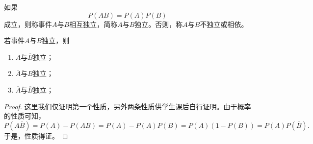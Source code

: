 \begin{definition}[独立性]
    如果
    $$P(AB) = P(A)P(B)$$
    成立，则称事件$A$与$B$相互独立，简称$A$与$B$独立。否则，称$A$与$B$不独立或相依。
\end{definition}

\begin{property}
若事件$A$与$B$独立，则
\begin{enumerate}
    \item $A$与$\overline{B}$独立；
     \item $\overline{A}$与$B$独立；
    \item $\overline{A}$与$\overline{B}$独立；
\end{enumerate}
\end{property}
\begin{proof}
    这里我们仅证明第一个性质，另外两条性质供学生课后自行证明。由于概率的性质可知，
    $$P(A\overline{B}) = P(A) - P(AB) = P(A)- P(A)P(B) = P(A)(1-P(B)) = P(A)P(\overline{B}).$$
    于是，性质得证。
\end{proof}

\vspace{8cm}

